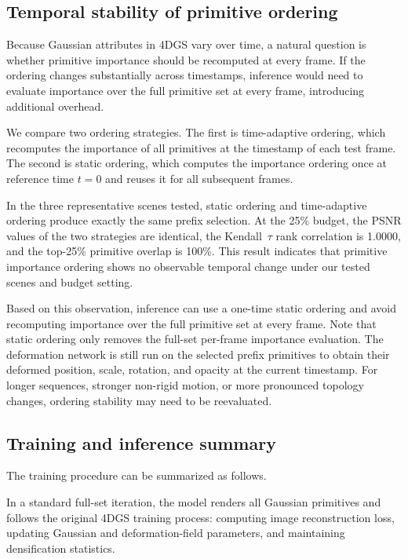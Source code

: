 \documentclass[pdflatex,sn-mathphys]{sn-jnl}
\begin{document}
\subsection{Temporal stability of primitive ordering}
\label{sec:static}

Because Gaussian attributes in 4DGS vary over time, a natural question is whether primitive importance should be recomputed at every frame. If the ordering changes substantially across timestamps, inference would need to evaluate importance over the full primitive set at every frame, introducing additional overhead.

We compare two ordering strategies. The first is time-adaptive ordering, which recomputes the importance of all primitives at the timestamp of each test frame. The second is static ordering, which computes the importance ordering once at reference time $t=0$ and reuses it for all subsequent frames.

In the three representative scenes tested, static ordering and time-adaptive ordering produce exactly the same prefix selection. At the 25\% budget, the PSNR values of the two strategies are identical, the Kendall~$\tau$ rank correlation is 1.0000, and the top-25\% primitive overlap is 100\%. This result indicates that primitive importance ordering shows no observable temporal change under our tested scenes and budget setting.

Based on this observation, inference can use a one-time static ordering and avoid recomputing importance over the full primitive set at every frame. Note that static ordering only removes the full-set per-frame importance evaluation. The deformation network is still run on the selected prefix primitives to obtain their deformed position, scale, rotation, and opacity at the current timestamp. For longer sequences, stronger non-rigid motion, or more pronounced topology changes, ordering stability may need to be reevaluated.

\subsection{Training and inference summary}
\label{sec:summary}

The training procedure can be summarized as follows.

In a standard full-set iteration, the model renders all Gaussian primitives and follows the original 4DGS training process: computing image reconstruction loss, updating Gaussian and deformation-field parameters, and maintaining densification statistics.
\end{document}
